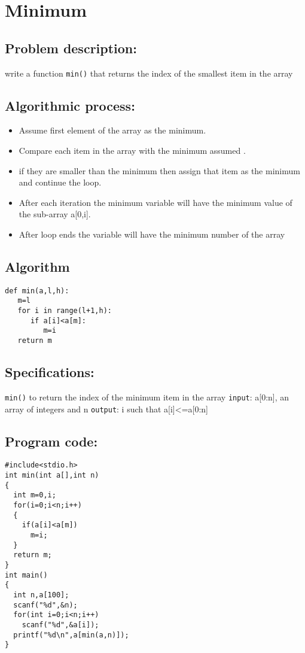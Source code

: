 \documentclass[11pt]{article}
\begin{document}
\section{Minimum}
\label{sec-7}

\subsection*{Problem description:}
\label{sec-7-1}
write a function \texttt{min()} that returns the index of the 
smallest item in the array

\subsection*{Algorithmic process:}
\label{sec-7-2}
\begin{itemize}
\item Assume first element of the array as the minimum.
\item Compare each item in the array with the minimum assumed .
\item if they are smaller than the minimum then assign that item as the minimum and continue the loop.
\item After each iteration the minimum variable will have the minimum value of the sub-array a[0,i].
\item After loop ends the variable will have the minimum number of the array
\end{itemize}
\subsection*{Algorithm}
\label{sec-7-3}
\begin{verbatim}
def min(a,l,h):
   m=l
   for i in range(l+1,h):
      if a[i]<a[m]:
         m=i
   return m
\end{verbatim}
\subsection*{Specifications:}
\label{sec-7-4}
\texttt{min()} to return the index of the minimum item in the array
\texttt{input}: a[0:n], an array of integers and n
\texttt{output}: i such that a[i]<=a[0:n]
\subsection*{Program code:}
\label{sec-7-5}

\begin{verbatim}
#include<stdio.h>
int min(int a[],int n)
{
  int m=0,i;
  for(i=0;i<n;i++)
  {
    if(a[i]<a[m])
      m=i;
  }
  return m;
}
int main()
{
  int n,a[100];
  scanf("%d",&n);
  for(int i=0;i<n;i++)
    scanf("%d",&a[i]);
  printf("%d\n",a[min(a,n)]);
}
\end{verbatim}
\end{document}
